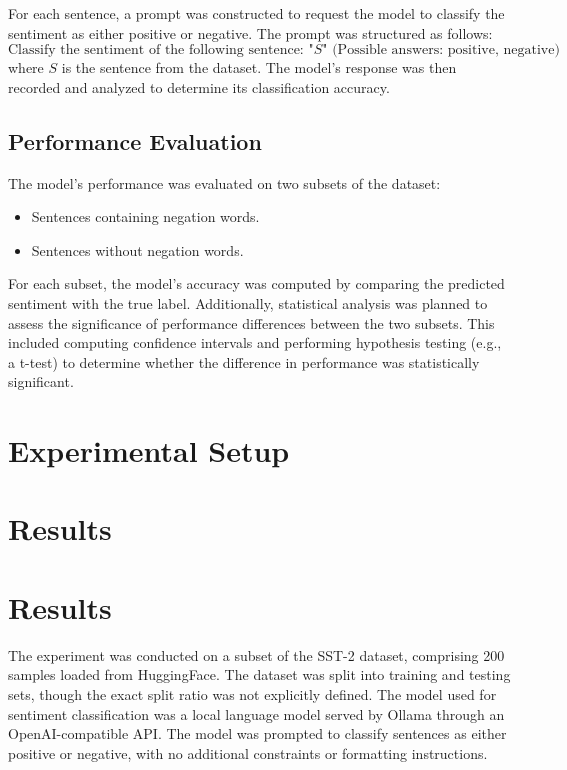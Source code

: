 \documentclass{article}
\begin{document}
For each sentence, a prompt was constructed to request the model to classify the sentiment as either positive or negative. The prompt was structured as follows:
$$
\text{Classify the sentiment of the following sentence: } \text{"}S\text{"} \text{ (Possible answers: positive, negative)}
$$
where $ S $ is the sentence from the dataset. The model's response was then recorded and analyzed to determine its classification accuracy.

\subsection{Performance Evaluation}

The model's performance was evaluated on two subsets of the dataset:
\begin{itemize}
    \item Sentences containing negation words.
    \item Sentences without negation words.
\end{itemize}
For each subset, the model's accuracy was computed by comparing the predicted sentiment with the true label. Additionally, statistical analysis was planned to assess the significance of performance differences between the two subsets. This included computing confidence intervals and performing hypothesis testing (e.g., a t-test) to determine whether the difference in performance was statistically significant.
\section{Experimental Setup}

\section{Results}
\section{Results}

The experiment was conducted on a subset of the SST-2 dataset, comprising 200 samples loaded from HuggingFace. The dataset was split into training and testing sets, though the exact split ratio was not explicitly defined. The model used for sentiment classification was a local language model served by Ollama through an OpenAI-compatible API. The model was prompted to classify sentences as either positive or negative, with no additional constraints or formatting instructions.
\end{document}
